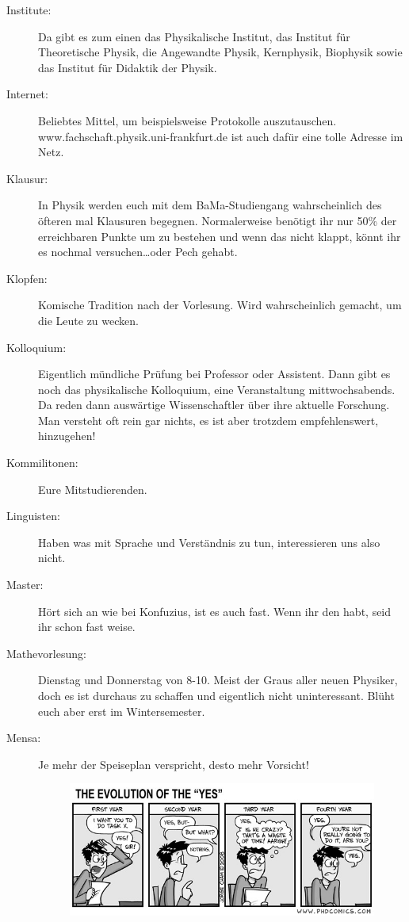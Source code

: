 \begin{description}
    \item[Institute:]Da gibt es zum einen das
Physikalische Institut, das Institut für Theoretische Physik, die
Angewandte Physik, Kernphysik, Biophysik sowie das Institut für Didaktik der Physik.

    \item[Internet:]Beliebtes
Mittel, um beispielsweise Protokolle auszutauschen.\\
www.fachschaft.physik.uni-frankfurt.de ist auch dafür eine
tolle Adresse im Netz.

    \item[Klausur:] In Physik werden euch mit dem BaMa-Studiengang
wahrscheinlich des öfteren mal Klausuren begegnen.
Normalerweise benötigt ihr nur 50\% der erreichbaren Punkte um zu bestehen und
wenn das nicht klappt, könnt ihr es nochmal versuchen\ldots oder Pech
gehabt.

    \item[Klopfen:] Komische Tradition nach der Vorlesung. Wird
wahrscheinlich gemacht, um die Leute zu wecken.

    \item[Kolloquium:]Eigentlich mündliche Prüfung bei Professor oder Assistent.
    Dann gibt es noch das physikalische Kolloquium, eine Veranstaltung mittwochsabends.
Da reden dann auswärtige Wissenschaftler über ihre aktuelle Forschung.
Man versteht oft rein gar nichts, es ist aber trotzdem empfehlenswert, hinzugehen!

    \item[Kommilitonen:] Eure Mitstudierenden.

\item[Linguisten:] Haben was mit Sprache und Verständnis zu tun, interessieren uns also nicht.

\item[Master:] Hört sich an wie bei Konfuzius, ist es auch fast.
Wenn ihr den habt, seid ihr schon fast weise.

    \item[Mathevorlesung:]Dienstag und Donnerstag von 8-10.
 Meist der Graus aller neuen Physiker, doch es
ist durchaus zu schaffen und eigentlich nicht uninteressant.
Blüht euch aber erst im Wintersemester.

    \item[Mensa:]Je mehr der Speiseplan verspricht, desto mehr Vorsicht!

\begin{figure}[!h]
 \begin{center}
  \includegraphics[width=\textwidth]{bilder/yes.jpg}
 \end{center}
\end{figure}


\end{description}
